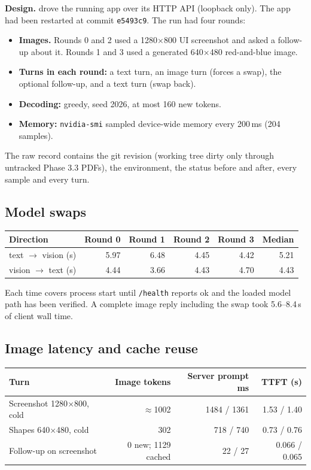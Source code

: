 \documentclass[11pt,a4paper]{article}
\newcommand{\code}[1]{\texttt{#1}}
\newcommand{\field}[1]{\textbf{#1}\quad}
\begin{document}
\field{Design.}  drove the running app over its HTTP
API (loopback only). The app had been restarted at commit \code{e5493c9}. The run had
four rounds:
\begin{itemize}
  \item \textbf{Images.} Rounds 0 and 2 used a 1280$\times$800 UI screenshot and asked a
        follow-up about it. Rounds 1 and 3 used a generated 640$\times$480 red-and-blue
        image.
  \item \textbf{Turns in each round:} a text turn, an image turn (forces a swap), the
        optional follow-up, and a text turn (swap back).
  \item \textbf{Decoding:} greedy, seed 2026, at most 160 new tokens.
  \item \textbf{Memory:} \code{nvidia-smi} sampled device-wide memory every 200\,ms (204
        samples).
\end{itemize}
The raw record contains the git revision (working tree dirty only through untracked
Phase 3.3 PDFs), the environment, the status before and after, every sample and every
turn.

\subsection{Model swaps}

\begin{center}
\small
\begin{tabular}{@{}lrrrrr@{}}
\toprule
Direction & Round 0 & Round 1 & Round 2 & Round 3 & Median \\
\midrule
text $\rightarrow$ vision (s) & 5.97 & 6.48 & 4.45 & 4.42 & 5.21 \\
vision $\rightarrow$ text (s) & 4.44 & 3.66 & 4.43 & 4.70 & 4.43 \\
\bottomrule
\end{tabular}
\end{center}

Each time covers process start until \code{/health} reports ok and the loaded model path
has been verified. A complete image reply including the swap took 5.6--8.4\,s of client
wall time.

\subsection{Image latency and cache reuse}

\begin{center}
\small
\begin{tabular}{@{}lrrr@{}}
\toprule
Turn & Image tokens & Server prompt ms & TTFT (s) \\
\midrule
Screenshot 1280$\times$800, cold & $\approx$1002 & 1484 / 1361 & 1.53 / 1.40 \\
Shapes 640$\times$480, cold & 302 & 718 / 740 & 0.73 / 0.76 \\
Follow-up on screenshot & 0 new; 1129 cached & 22 / 27 & 0.066 / 0.065 \\
\bottomrule
\end{tabular}
\end{center}
\end{document}
